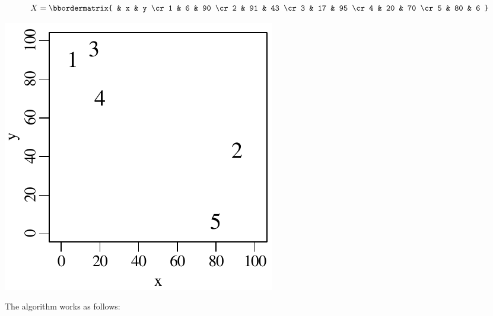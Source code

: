 \noindent\begin{minipage}[t][][b]{.25\textwidth}
  \begin{equation*}
  X =  \bbordermatrix{ & x & y \cr
      1 & 6 & 90 \cr
      2 & 91 & 43 \cr
      3 & 17 & 95 \cr
      4 & 20 & 70 \cr
      5 & 80 & 6
    }
  \end{equation*}
\end{minipage}
\begin{minipage}[t][][b]{.25\textwidth}
  \includegraphics[width=\textwidth]{../figures/hierarchical1.pdf}\medskip
\end{minipage}
\begin{minipage}[t][][t]{.5\textwidth}
  \label{fig:hierarchical1}
\end{minipage}

The algorithm works as follows:


